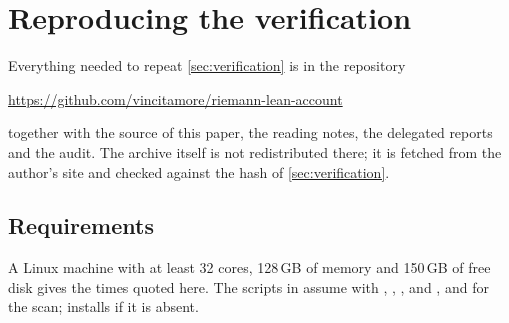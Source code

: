\section{Reproducing the verification}\label{app:reproduce}

Everything needed to repeat \cref{sec:verification} is in the repository
\begin{center}
\url{https://github.com/vincitamore/riemann-lean-account}
\end{center}
together with the source of this paper, the reading notes, the delegated reports and the audit.
The archive itself is not redistributed there; it is fetched from the author's site and checked
against the hash of \cref{sec:verification}.

\subsection*{Requirements}
A Linux machine with at least 32 cores, 128\,GB of memory and 150\,GB of free disk gives the
times quoted here. The scripts in  assume  with ,
, ,  and , and  for the scan;
 installs  if it is absent.


